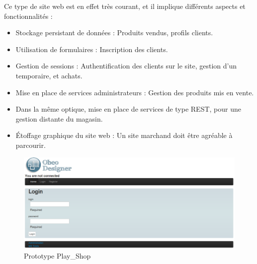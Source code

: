 Ce type de site web est en effet très courant, et il implique différents aspects et fonctionnalités : 
\begin{itemize}
\item Stockage persistant de données : Produits vendus, profils clients.
\item Utilisation de formulaires : Inscription des clients.
\item Gestion de sessions : Authentification des clients sur le site, gestion d'un  temporaire, et achats.
\item Mise en place de services administrateurs : Gestion des produits mis en vente.
\item Dans la même optique, mise en place de services de type REST, pour une gestion distante du magasin.
\item Étoffage graphique du site web : Un site marchand doit être agréable à parcourir.
\end{itemize}

\begin{figure}[htb]
  \centering
  \includegraphics[scale=.4]{img/proto.eps}
  \caption{Prototype Play\_Shop}
  \label{fig:pro}
\end{figure}





